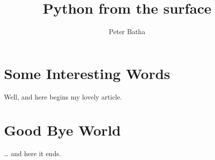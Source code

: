 \documentclass[a4paper,11pt]{article}
\author{Peter Batha}
\title{Python from the surface}
\begin{document}
\maketitle
\tableofcontents
\newpage
\section{Some Interesting Words}
Well, and here begins my lovely article.
\section{Good Bye World}
\ldots{} and here it ends.
\end{document}
